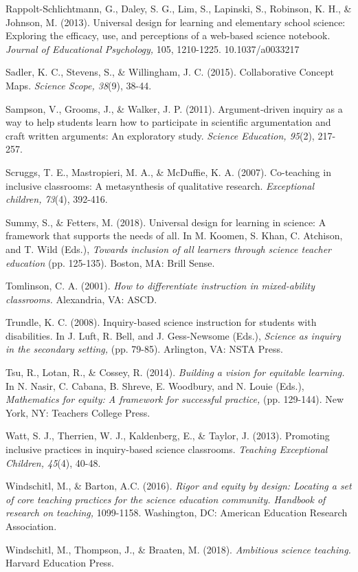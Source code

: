 \documentclass[11.5pt]{sig-alternate}
\begin{document}
Rappolt-Schlichtmann, G., Daley, S. G., Lim, S., Lapinski, S., Robinson, K. H., \& Johnson, M. (2013). Universal design for learning and elementary school science: Exploring the efficacy, use, and perceptions of a web-based science notebook. \textit{Journal of Educational Psychology,} 105, 1210-1225. 10.1037/a0033217 

Sadler, K. C., Stevens, S., \& Willingham, J. C. (2015). Collaborative Concept Maps. \textit{Science Scope, 38}(9), 38-44. 

Sampson, V., Grooms, J., \& Walker, J. P. (2011). Argument‐driven inquiry as a way to help students learn how to participate in scientific argumentation and craft written arguments: An exploratory study. \textit{Science Education, 95}(2), 217-257.

Scruggs, T. E., Mastropieri, M. A., \& McDuffie, K. A. (2007). Co-teaching in inclusive classrooms: A metasynthesis of qualitative research. \textit{Exceptional children, 73}(4), 392-416.

Summy, S., \& Fetters, M. (2018). Universal design for learning in science: A framework that supports the needs of all. In M. Koomen, S. Khan, C. Atchison, and T. Wild (Eds.), \textit{Towards inclusion of all learners through science teacher education} (pp. 125-135). Boston, MA: Brill Sense.

Tomlinson, C. A. (2001). \textit{How to differentiate instruction in mixed-ability classrooms.} Alexandria, VA: ASCD.

Trundle, K. C. (2008). Inquiry-based science instruction for students with disabilities. In J. Luft, R. Bell, and J. Gess-Newsome (Eds.), \textit{Science as inquiry in the secondary setting,} (pp. 79-85). Arlington, VA: NSTA Press.

Tsu, R., Lotan, R., \& Cossey, R. (2014). \textit{Building a vision for equitable learning.} In N. Nasir, C. Cabana, B. Shreve, E. Woodbury, and N. Louie (Eds.), \textit{Mathematics for equity: A framework for successful practice,} (pp. 129-144). New York, NY: Teachers College Press.

Watt, S. J., Therrien, W. J., Kaldenberg, E., \& Taylor, J. (2013). Promoting inclusive practices in inquiry-based science classrooms. \textit{Teaching Exceptional Children, 45}(4), 40-48.

Windschitl, M., \& Barton, A.C. (2016). \textit{Rigor and equity by design: Locating a set of core teaching practices for the science education community. Handbook of research on teaching,} 1099-1158. Washington, DC: American Education Research Association.

Windschitl, M., Thompson, J., \& Braaten, M. (2018). \textit{Ambitious science teaching.} Harvard Education Press.
\end{document}
